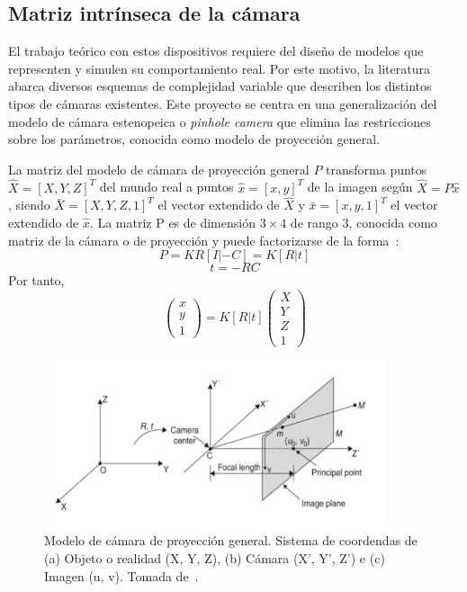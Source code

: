 \subsection{Matriz intrínseca de la cámara}\label{section:calibration}

El trabajo teórico con estos dispositivos requiere del diseño de modelos que representen y simulen su comportamiento real. Por este motivo, la literatura abarca diversos esquemas de complejidad variable que describen los distintos tipos de cámaras existentes. Este proyecto se centra en una generalización del modelo de cámara estenopeica o \textit{pinhole camera} que elimina las restricciones sobre los parámetros, conocida como modelo de proyección general. 

\begin{definition}
	La matriz del modelo de cámara de proyección general $P$ transforma puntos $\hat{X} = [X, Y, Z]^T$ del mundo real a puntos $\hat{x} = [x, y]^T$ de la imagen según $\hat{X} = P\hat{x}$, siendo $\bar{X} = [X, Y, Z, 1]^T$ el vector extendido de $\hat{X}$ y $\bar{x} = [x, y, 1]^T$ el vector extendido de $\hat{x}$. La matriz P es de dimensión $3 \times 4$ de rango 3, conocida como matriz de la cámara o de proyección y puede factorizarse de la forma~\cite{hartley2004camera}:
	\begin{equation}\label{eq:proyGeneral-1}
		P = KR[I| - C] = K[R|t]
	\end{equation}
	\begin{equation}\label{eq:proyGeneral-2}
		t = -RC
	\end{equation}
	Por tanto,
	\begin{equation}\label{eq:proyGeneral-3}
		\begin{pmatrix}
			x\\
			y\\
			1
		\end{pmatrix} = K[R|t] \begin{pmatrix}
			X\\
			Y\\
			Z\\
			1	
		\end{pmatrix}
	\end{equation}
\end{definition}

\begin{figure}[ht]
	\centering
	\includegraphics[width=10cm]{./Graphics/modelo-proyeccion-general.png}
	\caption{Modelo de cámara de proyección general. Sistema de coordendas de (a) Objeto o realidad (X, Y, Z), (b) Cámara (X', Y', Z') e (c) Imagen (u, v). Tomada de~\cite{ji2022vision}.}
	\label{fig:proyGeneral}
\end{figure}

